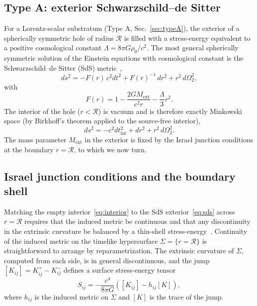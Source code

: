 \documentclass[%
  reprint,
  superscriptaddress,
  showpacs,
  showkeys,
  amsmath,amssymb,
  pra,
  longbibliography,
  floatfix,
  x11names
]{revtex4-2}
\begin{document}
\subsection{Type A: exterior Schwarzschild--de Sitter}
\label{sec:exact_typeA}

For a Lorentz-scalar substratum (Type A, Sec.~\ref{sec:typeA}), the exterior of a spherically symmetric hole of radius $\mathcal{R}$ is filled with a stress-energy equivalent to a positive cosmological constant $\Lambda = 8\pi G \rho_0/c^2$. The most general spherically symmetric solution of the Einstein equations with cosmological constant is the Schwarzschild--de Sitter (SdS) metric~\cite{kottler-1918,wald-1984},
\begin{equation}
ds^2 = -F(r)\, c^2 dt^2 + F(r)^{-1}\, dr^2 + r^2\, d\Omega_2^2,
\label{eq:sds}
\end{equation}
with
\begin{equation}
F(r) = 1 - \frac{2 G M_{\mathrm{ext}}}{c^2 r} - \frac{\Lambda}{3} r^2.
\label{eq:F_sds}
\end{equation}
The interior of the hole ($r < \mathcal{R}$) is vacuum and is therefore exactly Minkowski space (by Birkhoff's theorem applied to the source-free interior),
\begin{equation}
ds^2 = -c^2 dt_{\mathrm{int}}^2 + dr^2 + r^2\, d\Omega_2^2.
\label{eq:interior}
\end{equation}
The mass parameter $M_{\mathrm{ext}}$ in the exterior is fixed by the Israel junction conditions at the boundary $r = \mathcal{R}$, to which we now turn.

\subsection{Israel junction conditions and the boundary shell}
\label{sec:israel}

Matching the empty interior~\eqref{eq:interior} to the SdS exterior~\eqref{eq:sds} across $r = \mathcal{R}$ requires that the induced metric be continuous and that any discontinuity in the extrinsic curvature be balanced by a thin-shell stress-energy~\cite{israel-1966,poisson-2004}. Continuity of the induced metric on the timelike hypersurface $\Sigma = \{r = \mathcal{R}\}$ is straightforward to arrange by reparametrization. The extrinsic curvature of $\Sigma$, computed from each side, is in general discontinuous, and the jump $[K_{ij}] = K^{+}_{ij} - K^{-}_{ij}$ defines a surface stress-energy tensor
\begin{equation}
S_{ij} = -\frac{c^4}{8\pi G}\left([K_{ij}] - h_{ij} [K]\right),
\label{eq:Sij}
\end{equation}
where $h_{ij}$ is the induced metric on $\Sigma$ and $[K]$ is the trace of the jump.
\end{document}
